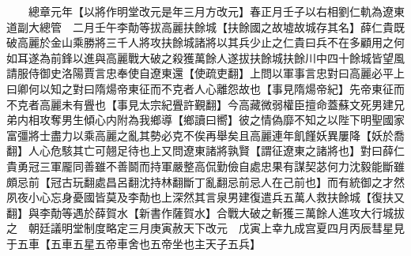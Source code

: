 　　總章元年【以將作明堂改元是年三月方改元】春正月壬子以右相劉仁軌為遼東道副大總管　二月壬午李勣等拔高麗扶餘城【扶餘國之故墟故城存其名】薛仁貴既破高麗於金山乘勝將三千人將攻扶餘城諸將以其兵少止之仁貴曰兵不在多顧用之何如耳遂為前鋒以進與高麗戰大破之殺獲萬餘人遂拔扶餘城扶餘川中四十餘城皆望風請服侍御史洛陽賈言忠奉使自遼東還【使疏吏翻】上問以軍事言忠對曰高麗必平上曰卿何以知之對曰隋煬帝東征而不克者人心離怨故也【事見隋煬帝紀】先帝東征而不克者高麗未有舋也【事見太宗紀舋許覲翻】今高藏微弱權臣擅命蓋蘇文死男建兄弟内相攻奪男生傾心内附為我鄉導【鄉讀曰嚮】彼之情偽靡不知之以陛下明聖國家富彊將士盡力以乘高麗之亂其勢必克不俟再舉矣且高麗連年飢饉妖異屢降【妖於喬翻】人心危駭其亡可翹足待也上又問遼東諸將孰賢【謂征遼東之諸將也】對曰薛仁貴勇冠三軍龎同善雖不善鬬而持軍嚴整高侃勤儉自處忠果有謀契苾何力沈毅能斷雖頗忌前【冠古玩翻處昌呂翻沈持林翻斷丁亂翻忌前忌人在己前也】而有統御之才然夙夜小心忘身憂國皆莫及李勣也上深然其言泉男建復遣兵五萬人救扶餘城【復扶又翻】與李勣等遇於薛賀水【新書作薩賀水】合戰大破之斬獲三萬餘人進攻大行城拔之　朝廷議明堂制度略定三月庚寅赦天下改元　戊寅上幸九成宫夏四月丙辰彗星見于五車【五車五星五帝車舍也五帝坐也主天子五兵】

